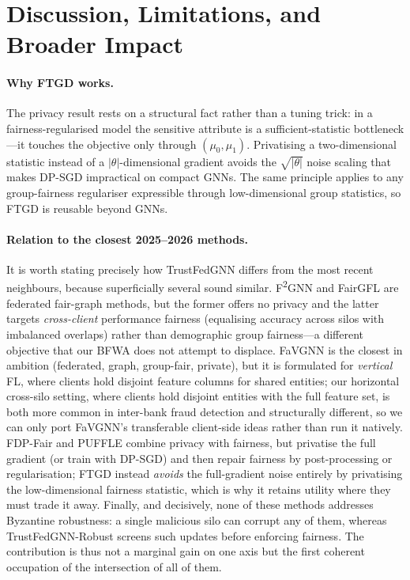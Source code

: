 \section{Discussion, Limitations, and Broader Impact}
\label{sec:discussion}

\paragraph{Why FTGD works.}
The privacy result rests on a structural fact rather than a tuning trick: in a
fairness-regularised model the sensitive attribute is a sufficient-statistic
bottleneck---it touches the objective only through $(\mu_0,\mu_1)$. Privatising
a two-dimensional statistic instead of a $|\theta|$-dimensional gradient avoids
the $\sqrt{|\theta|}$ noise scaling that makes DP-SGD impractical on compact
GNNs. The same principle applies to any group-fairness regulariser expressible
through low-dimensional group statistics, so FTGD is reusable beyond GNNs.

\paragraph{Relation to the closest 2025--2026 methods.}
It is worth stating precisely how TrustFedGNN differs from the most recent
neighbours, because superficially several sound similar. F\textsuperscript{2}GNN
and FairGFL are federated fair-graph methods, but the former offers no privacy
and the latter targets \emph{cross-client} performance fairness (equalising
accuracy across silos with imbalanced overlaps) rather than demographic group
fairness---a different objective that our BFWA does not attempt to displace.
FaVGNN is the closest in ambition (federated, graph, group-fair, private), but
it is formulated for \emph{vertical} FL, where clients hold disjoint feature
columns for shared entities; our horizontal cross-silo setting, where clients
hold disjoint entities with the full feature set, is both more common in
inter-bank fraud detection and structurally different, so we can only port
FaVGNN's transferable client-side ideas rather than run it natively. FDP-Fair
and PUFFLE combine privacy with fairness, but privatise the full gradient (or
train with DP-SGD) and then repair fairness by post-processing or regularisation;
FTGD instead \emph{avoids} the full-gradient noise entirely by privatising the
low-dimensional fairness statistic, which is why it retains utility where they
must trade it away. Finally, and decisively, none of these methods addresses
Byzantine robustness: a single malicious silo can corrupt any of them, whereas
TrustFedGNN-Robust screens such updates before enforcing fairness. The
contribution is thus not a marginal gain on one axis but the first coherent
occupation of the intersection of all of them.

